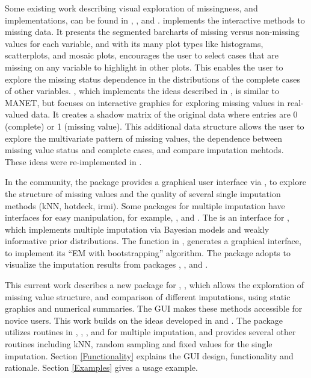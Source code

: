 \documentclass[article]{jss}
\begin{document}
Some existing work describing visual exploration of missingness, and implementations, can be found in \citet{unwin1996interactive}, \citet{swayne1998missing}, and \citet{templ2008visualization}.  \citep{unwin1996interactive} implements the interactive methods to missing data. It presents the segmented barcharts of missing versus non-missing values for each variable, and with its many plot types like histograms, scatterplots, and mosaic plots, encourages the user to select cases that are missing on any variable to highlight in other plots. This enables the user to explore the missing status dependence in the distributions of the complete cases of other variables.  \citep{swayne1998xgobi}, which implements the ideas described in \citet{swayne1998missing}, is similar to MANET, but focuses on interactive graphics for exploring missing values in real-valued data. It creates a shadow matrix of the original data where entries are 0 (complete) or 1 (missing value). This additional data structure allows the user to explore the multivariate pattern of missing values, the dependence between missing value status and complete cases, and compare imputation mehtods. These ideas were re-implemented in  \citep{STLBC03}.

In the  community, the package  \citep{VIM} provides a graphical user interface via  \citep{VIMGUI}, to explore the structure of missing values and the quality of several single imputation methods (kNN, hotdeck, irmi). Some packages for multiple imputation have interfaces for easy manipulation, for example, ,  and . The  \citep{migui} is an interface for  \citep{mi}, which implements multiple imputation via Bayesian models and weakly informative prior distributions. The function  in  \citep{amelia}, generates a graphical interface, to implement its ``EM with bootstrapping'' algorithm. The package  \citep{mip} adopts  to visualize the imputation results from packages , , and .

This current work describes a new package for , , which allows the exploration of missing value structure, and comparison of different imputations, using static graphics and numerical summaries. The GUI makes these methods accessible for novice users. This work builds on the ideas developed in \citet{unwin1996interactive} and \citet{swayne1998missing}. The package utilizes routines in , , , and  for multiple imputation, and provides several other routines including kNN, random sampling and fixed values for the single imputation. Section \ref{Functionality} explains the GUI design, functionality and rationale.  Section \ref{Examples} gives a usage example. 
\end{document}
